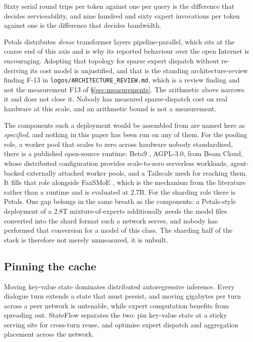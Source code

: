 \documentclass[11pt]{article}
\begin{document}
Sixty serial round trips per token against one per query is the difference that decides serviceability, and nine hundred and sixty expert invocations per token against one is the difference that decides bandwidth.

Petals \cite{borzunov2023petals,neurips2023petals} distributes \emph{dense} transformer layers pipeline-parallel, which sits at the coarse end of this axis and is why its reported behaviour over the open Internet is encouraging. Adopting that topology for sparse expert dispatch without re-deriving its cost model is unjustified, and that is the standing architecture-review finding F-13 in \texttt{logos/ARCHITECTURE\_REVIEW.md}, which is a review finding and not the measurement F13 of \S\ref{sec:measurements}. The arithmetic above narrows it and does not close it. Nobody has measured sparse-dispatch cost on real hardware at this scale, and an arithmetic bound is not a measurement.

The components such a deployment would be assembled from are named here as \emph{specified}, and nothing in this paper has been run on any of them. For the pooling role, a worker pool that scales to zero across hardware nobody standardised, there is a published open-source runtime: Beta9 \cite{beamcloud2026beta9}, AGPL-3.0, from Beam Cloud, whose distributed configuration provides scale-to-zero serverless workloads, agent-backed externally attached worker pools, and a Tailscale mesh for reaching them. It fills that role alongside FaaSMoE \cite{faasmoe2026}, which is the mechanism from the literature rather than a runtime and is evaluated at 2.7B. For the sharding role there is Petals. One gap belongs in the same breath as the components: a Petals-style deployment of a 2.8T mixture-of-experts additionally needs the model files converted into the shard format such a network serves, and nobody has performed that conversion for a model of this class. The sharding half of the stack is therefore not merely unmeasured, it is unbuilt.

\subsection{Pinning the cache}

Moving key-value state dominates distributed autoregressive inference. Every dialogue turn extends a state that must persist, and moving gigabytes per turn across a peer network is untenable, while expert computation benefits from spreading out. StateFlow \cite{stateflow2026} separates the two: pin key-value state at a sticky serving site for cross-turn reuse, and optimise expert dispatch and aggregation placement across the network.
\end{document}
